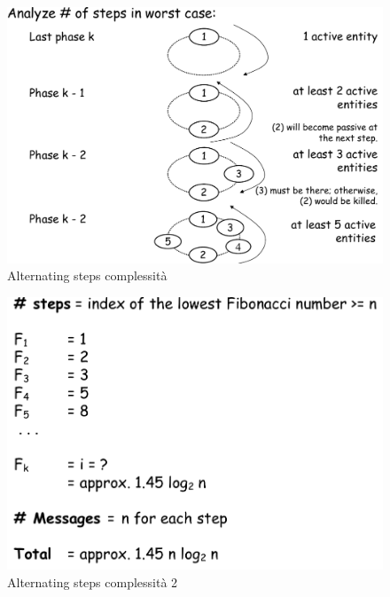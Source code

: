\documentclass[12pt]{article}
\begin{document}
			\begin{figure}[h!]
				\centering
				\includegraphics[scale=0.40]{img/compalt.png}
				\caption{Alternating steps complessità}
			\end{figure}
			\begin{figure}[h!]
				\centering
				\includegraphics[scale=0.40]{img/compalt2.png}
				\caption{Alternating steps complessità 2}
			\end{figure}
		
\end{document}
